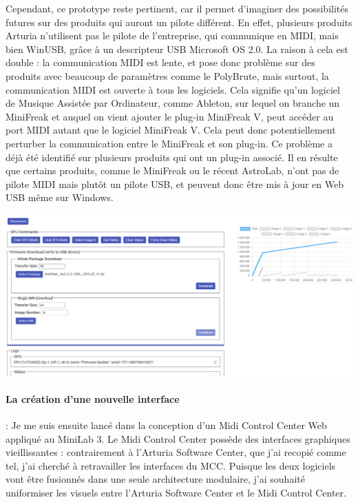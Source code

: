 \documentclass[francais]{rapportPFE}  %
\begin{document}
Cependant, ce prototype reste pertinent, car il permet d'imaginer des possibilités futures sur des produits qui auront un pilote différent.
En effet, plusieurs produits Arturia n'utilisent pas le pilote de l'entreprise, qui communique en MIDI, mais bien WinUSB, grâce à un descripteur USB Microsoft OS 2.0. La raison à cela est double : la communication MIDI est lente, et pose donc problème sur des produits avec beaucoup de paramètres comme le PolyBrute, mais surtout, la communication MIDI est ouverte à tous les logiciels. Cela signifie qu'un logiciel de Musique Assistée par Ordinateur, comme Ableton, sur lequel on branche un MiniFreak et auquel on vient ajouter le plug-in MiniFreak V, peut accéder au port MIDI autant que le logiciel MiniFreak V. Cela peut donc potentiellement perturber la communication entre le MiniFreak et son plug-in. Ce problème a déjà été identifié sur plusieurs produits qui ont un plug-in associé.
Il en résulte que certains produits, comme le MiniFreak ou le récent AstroLab, n'ont pas de pilote MIDI mais plutôt un pilote USB, et peuvent donc être mis à jour en Web USB même sur Windows.



\begin{center}
	\centering
	\includegraphics[width=15cm]{graphics/dfu.png}
	\begin{tiny}
	\end{tiny}
	\label{fig}
\end{center}


\paragraph{La création d'une nouvelle interface}:
Je me suis ensuite lancé dans la conception d'un Midi Control Center Web appliqué au MiniLab 3.
Le Midi Control Center possède des interfaces graphiques vieillissantes : contrairement à l'Arturia Software Center, que j'ai recopié comme tel, j'ai cherché à retravailler les interfaces du MCC. Puisque les deux logiciels vont être fusionnés dans une seule architecture modulaire, j'ai souhaité uniformiser les visuels entre l'Arturia Software Center et le Midi Control Center.
\end{document}
